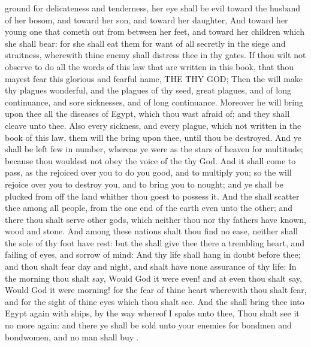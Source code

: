 {ground for
delicateness and
tenderness, her
eye shall be
evil toward the
husband of her
bosom, and toward her
son, and toward her
daughter,
And toward her young
one that cometh
out from between her
feet, and toward her
children which she shall
bear: for she shall
eat them for
want of all
{}
secretly in the
siege and
straitness, wherewith thine
enemy shall
distress thee in thy
gates.
If thou wilt not
observe to
do all the
words of this
law that are
written in this
book, that thou mayest
fear this
glorious and
fearful
name, THE
{} THY
GOD;
Then the
{} will
make thy
plagues
wonderful, and the
plagues of thy
seed,
{}
great
plagues, and of long
continuance, and
sore
sicknesses, and of long
continuance.
Moreover he will
bring upon thee all the
diseases of
Egypt, which thou wast
afraid
of; and they shall
cleave unto thee.
Also every
sickness, and every
plague, which
{} not
written in the
book of this
law, them will the
{}
bring upon thee, until thou be
destroyed.
And ye shall be
left
few in
number,
whereas ye were as the
stars of
heaven for
multitude; because thou wouldest not
obey the
voice of the
{} thy
God.
And it shall come to pass,
{} as the
{}
rejoiced over you to do you
good, and to
multiply you; so the
{} will
rejoice over you to
destroy you, and to bring you to
nought; and ye shall be
plucked from off the
land whither thou
goest to
possess it.
And the
{} shall
scatter thee among all
people, from the one
end of the
earth even unto the
other; and there thou shalt
serve
other
gods, which neither thou nor thy
fathers have
known,
{}
wood and
stone.
And among
these
nations shalt thou find no
ease, neither shall the
sole of thy
foot have
rest: but the
{} shall
give thee there a
trembling
heart, and
failing of
eyes, and
sorrow of
mind:
And thy
life shall
hang in doubt
before thee; and thou shalt
fear
day and
night, and shalt have none
assurance of thy
life:
In the
morning thou shalt
say, Would God it
were
even! and at
even thou shalt
say, Would God it
were
morning! for the
fear of thine
heart wherewith thou shalt
fear, and for the
sight of thine
eyes which thou shalt
see.
And the
{} shall
bring thee into
Egypt
again with
ships, by the
way whereof I
spake unto thee, Thou shalt
see it no more
again: and there ye shall be
sold unto your
enemies for
bondmen and
bondwomen, and no man shall
buy
{}.

}
